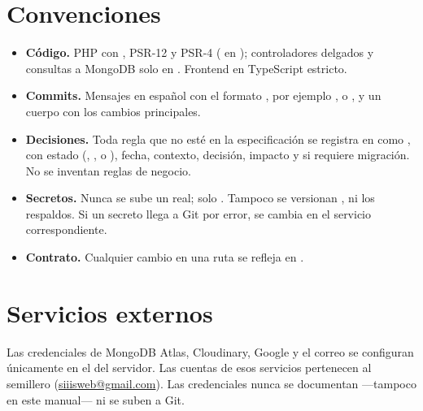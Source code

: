 \documentclass[11pt,a4paper]{article}
\begin{document}
\section{Convenciones}

\begin{itemize}
  \item \textbf{C\'odigo.} PHP con , PSR-12 y PSR-4 ( en );
    controladores delgados y consultas a MongoDB solo en . Frontend en TypeScript estricto.
  \item \textbf{Commits.} Mensajes en espa\~nol con el formato , por ejemplo
    ,  o , y un cuerpo con los cambios principales.
  \item \textbf{Decisiones.} Toda regla que no est\'e en la especificaci\'on se registra en  como
    , con estado (, ,  o ), fecha,
    contexto, decisi\'on, impacto y si requiere migraci\'on. No se inventan reglas de negocio.
  \item \textbf{Secretos.} Nunca se sube un  real; solo . Tampoco se versionan
    ,  ni los respaldos. Si un secreto llega a Git por error, se cambia en el servicio
    correspondiente.
  \item \textbf{Contrato.} Cualquier cambio en una ruta se refleja en .
\end{itemize}

\section{Servicios externos}

Las credenciales de MongoDB Atlas, Cloudinary, Google y el correo se configuran \'unicamente en el  del
servidor. Las cuentas de esos servicios pertenecen al semillero
(\href{mailto:siiisweb@gmail.com}{siiisweb@gmail.com}). Las credenciales nunca se documentan ---tampoco en este
manual--- ni se suben a Git.
\end{document}
